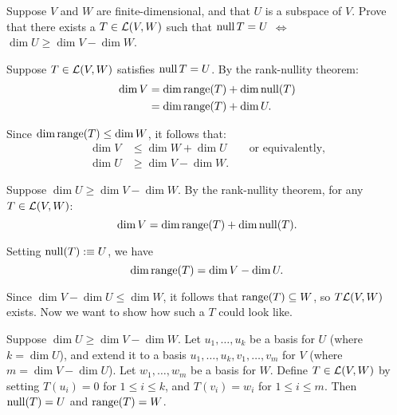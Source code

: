 \begin{xrcs}
  Suppose $V$ and $W$ are finite-dimensional, and that $U$ is a subspace of $V$. Prove that there exists a $T \in \mathcal{L}(V,W)$ such that $\operatorname{null} T = U$ $\iff$ $\dim U \geq \dim V - \dim W$.

  \begin{prf}
    \Rightarrowdirection Suppose $T \in \mathcal{L}(V,W)$ satisfies $\operatorname{null} T = U$. By the rank-nullity theorem:
    \begin{equation}
      \begin{aligned}
        \dim V &= \dim \operatorname{range}(T) + \dim \operatorname{null}(T) \\
        &= \dim \operatorname{range}(T) + \dim U.
      \end{aligned}
    \end{equation}

    Since $\dim \operatorname{range}(T) \leq \dim W$, it follows that:
    \begin{equation}
      \begin{aligned}
        \dim V &\leq \dim W + \dim U \qquad \text{or equivalently,}  \\
        \dim U &\geq \dim V - \dim W.
      \end{aligned}
    \end{equation}

    \Leftarrowdirection Suppose $\dim U \geq \dim V - \dim W$. By the rank-nullity theorem, for any $T \in \mathcal{L}(V,W)$:
    \begin{equation}
      \dim V = \dim \operatorname{range}(T) + \dim \operatorname{null}(T).
    \end{equation}

    Setting $\operatorname{null}(T) :\equiv U$, we have
    \begin{equation}
      \dim \operatorname{range}(T) = \dim V - \dim U.
    \end{equation}

    Since $\dim V - \dim U \leq \dim W$, it follows that $\operatorname{range}(T) \subseteq W$, so $T\mathcal{L} (V,W)$ exists. Now we want to show how such a $T$ could look like.

    Suppose $\dim U \geq \dim V - \dim W$. Let $u_1, \dots, u_k$ be a basis for $U$ (where $k = \dim U$), and extend it to a basis $u_1, \dots, u_k, v_1, \dots, v_m$ for $V$ (where $m = \dim V - \dim U$). Let $w_1, \dots, w_m$ be a basis for $W$. Define $T \in \mathcal{L}(V,W)$ by setting $T(u_i) = 0$ for $1 \leq i \leq k$, and $T(v_i) = w_i$ for $1 \leq i \leq m$. Then $\operatorname{null}(T) = U$ and $\operatorname{range}(T) = W$.
  \end{prf}
\end{xrcs}

